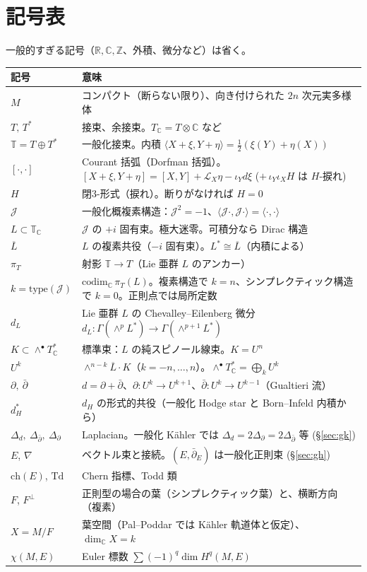 \documentclass[11pt,a4paper]{article}
\theoremstyle{definition}
\newcommand{\R}{\mathbb R}\newcommand{\C}{\mathbb C}\newcommand{\Z}{\mathbb Z}
\newcommand{\bT}{\mathbb T}
\newcommand{\Lb}{\overline L}
\newcommand{\Jc}{\mathcal J}
\newcommand{\dbar}{\bar\partial}
\newcommand{\ch}{\mathrm{ch}}\newcommand{\Td}{\mathrm{Td}}
\begin{document}
\section{記号表}
一般的すぎる記号（$\R,\C,\Z$、外積、微分など）は省く。

\begin{longtable}{>{\raggedright}p{3.1cm}p{11.8cm}}
\toprule 記号 & 意味\\ \midrule\endhead
$M$ & コンパクト（断らない限り）、向き付けられた $2n$ 次元実多様体\\
$T,\,T^*$ & 接束、余接束。$T_\C=T\otimes\C$ など\\
$\bT=T\oplus T^*$ & 一般化接束。内積 $\langle X+\xi,Y+\eta\rangle=\tfrac12(\xi(Y)+\eta(X))$\\
$[\cdot,\cdot]$ & Courant 括弧（Dorfman 括弧）。$[X+\xi,Y+\eta]=[X,Y]+\mathcal L_X\eta-\iota_Y d\xi$ ($+\,\iota_Y\iota_X H$ は $H$-捩れ)\\
$H$ & 閉3-形式（捩れ）。断りがなければ $H=0$\\
$\Jc$ & 一般化概複素構造：$\Jc^2=-1$、$\langle\Jc\cdot,\Jc\cdot\rangle=\langle\cdot,\cdot\rangle$\\
$L\subset\bT_\C$ & $\Jc$ の $+i$ 固有束。極大迷零。可積分なら Dirac 構造\\
$\Lb$ & $L$ の複素共役（$-i$ 固有束）。$L^*\cong\Lb$（内積による）\\
$\pi_T$ & 射影 $\bT\to T$（Lie 亜群 $L$ のアンカー）\\
$k=\mathrm{type}(\Jc)$ & $\mathrm{codim}_\C\,\pi_T(L)$。複素構造で $k=n$、シンプレクティック構造で $k=0$。正則点では局所定数\\
$d_L$ & Lie 亜群 $L$ の Chevalley--Eilenberg 微分 $d_L:\Gamma(\wedge^pL^*)\to\Gamma(\wedge^{p+1}L^*)$\\
$K\subset\wedge^\bullet T^*_\C$ & 標準束：$L$ の純スピノール線束。$K=U^n$\\
$U^k$ & $\wedge^{n-k}\Lb\cdot K$（$k=-n,\dots,n$）。$\wedge^\bullet T^*_\C=\bigoplus_kU^k$\\
$\partial,\ \dbar$ & $d=\partial+\dbar$、$\partial:U^k\to U^{k+1}$、$\dbar:U^k\to U^{k-1}$（Gualtieri 流）\\
$d_H^*$ & $d_H$ の形式的共役（一般化 Hodge star と Born--Infeld 内積から）\\
$\Delta_d,\ \Delta_{\dbar},\ \Delta_{\partial}$ & Laplacian。一般化 Kähler では $\Delta_d=2\Delta_\partial=2\Delta_{\dbar}$ 等 (\S\ref{sec:gk})\\
$E$, $\nabla$ & ベクトル束と接続。$(E,\dbar_E)$ は一般化正則束 (\S\ref{sec:gh})\\
$\ch(E)$, $\Td$ & Chern 指標、Todd 類\\
$F$, $F^\perp$ & 正則型の場合の葉（シンプレクティック葉）と、横断方向（複素）\\
$X=M/F$ & 葉空間（Pal--Poddar では Kähler 軌道体と仮定）、$\dim_\C X=k$\\
$\chi(M,E)$ & Euler 標数 $\sum(-1)^q\dim H^q(M,E)$\\
\bottomrule
\end{longtable}
\end{document}

